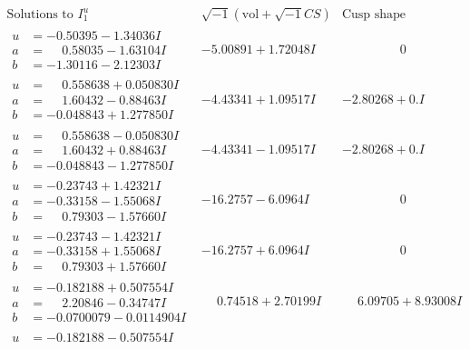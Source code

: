 \documentclass[1p]{elsarticle_modified}
\theoremstyle{definition}
\newcommand{\I}{\sqrt{-1}}
\begin{document}
$$\begin{array}{c|c|c}
\text{Solutions to }I^u_{1}& \I (\text{vol} + \sqrt{-1}CS) & \text{Cusp shape}\\
 \hline 
\begin{aligned}
u &= -0.50395 - 1.34036 I \\
a &= \phantom{-}0.58035 - 1.63104 I \\
b &= -1.30116 - 2.12303 I\end{aligned}
 & -5.00891 + 1.72048 I & \phantom{-0.000000 } 0 \\ \hline\begin{aligned}
u &= \phantom{-}0.558638 + 0.050830 I \\
a &= \phantom{-}1.60432 - 0.88463 I \\
b &= -0.048843 + 1.277850 I\end{aligned}
 & -4.43341 + 1.09517 I & -2.80268 + 0. I\phantom{ +0.000000I} \\ \hline\begin{aligned}
u &= \phantom{-}0.558638 - 0.050830 I \\
a &= \phantom{-}1.60432 + 0.88463 I \\
b &= -0.048843 - 1.277850 I\end{aligned}
 & -4.43341 - 1.09517 I & -2.80268 + 0. I\phantom{ +0.000000I} \\ \hline\begin{aligned}
u &= -0.23743 + 1.42321 I \\
a &= -0.33158 - 1.55068 I \\
b &= \phantom{-}0.79303 - 1.57660 I\end{aligned}
 & -16.2757 - 6.0964 I & \phantom{-0.000000 } 0 \\ \hline\begin{aligned}
u &= -0.23743 - 1.42321 I \\
a &= -0.33158 + 1.55068 I \\
b &= \phantom{-}0.79303 + 1.57660 I\end{aligned}
 & -16.2757 + 6.0964 I & \phantom{-0.000000 } 0 \\ \hline\begin{aligned}
u &= -0.182188 + 0.507554 I \\
a &= \phantom{-}2.20846 - 0.34747 I \\
b &= -0.0700079 - 0.0114904 I\end{aligned}
 & \phantom{-}0.74518 + 2.70199 I & \phantom{-}6.09705 + 8.93008 I \\ \hline\begin{aligned}
u &= -0.182188 - 0.507554 I \\

\end{aligned}
\end{array}$$
\end{document}
